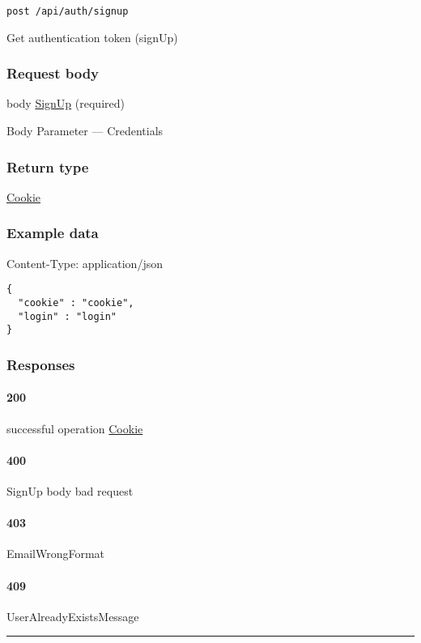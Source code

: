\protect\hypertarget{signUp}{}{}


\begin{verbatim}
post /api/auth/signup
\end{verbatim}

Get authentication token ({signUp})

\hypertarget{request-body-7}{%
\subsubsection*{Request body}\label{request-body-7}}

body \protect\hyperlink{SignUp}{SignUp} (required)

{Body Parameter} --- Credentials

\hypertarget{return-type-22}{%
\subsubsection*{Return type}\label{return-type-22}}

\protect\hyperlink{Cookie}{Cookie}

\hypertarget{example-data-22}{%
\subsubsection*{Example data}\label{example-data-22}}

Content-Type: application/json

\begin{verbatim}
{
  "cookie" : "cookie",
  "login" : "login"
}
\end{verbatim}

\hypertarget{responses-22}{%
\subsubsection*{Responses}\label{responses-22}}

\hypertarget{section-77}{%
\paragraph{200}\label{section-77}}

successful operation \protect\hyperlink{Cookie}{Cookie}

\hypertarget{section-78}{%
\paragraph{400}\label{section-78}}

SignUp body bad request \protect\hyperlink{}{}

\hypertarget{section-79}{%
\paragraph{403}\label{section-79}}

EmailWrongFormat \protect\hyperlink{}{}

\hypertarget{section-80}{%
\paragraph{409}\label{section-80}}

UserAlreadyExistsMessage \protect\hyperlink{}{}

\begin{center}\rule{0.5\linewidth}{0.5pt}\end{center}